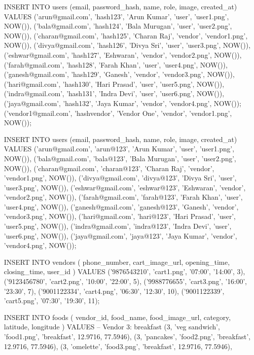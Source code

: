 INSERT INTO users (email, password_hash, name, role, image, created_at)
VALUES
('arun@gmail.com',   'hash123', 'Arun Kumar',   'user',   'user1.png', NOW()),
('bala@gmail.com',   'hash124', 'Bala Murugan', 'user',   'user2.png', NOW()),
('charan@gmail.com', 'hash125', 'Charan Raj',   'vendor', 'vendor1.png', NOW()),
('divya@gmail.com',  'hash126', 'Divya Sri',    'user',   'user3.png', NOW()),
('eshwar@gmail.com', 'hash127', 'Eshwaran',     'vendor', 'vendor2.png', NOW()),
('farah@gmail.com',  'hash128', 'Farah Khan',   'user',   'user4.png', NOW()),
('ganesh@gmail.com', 'hash129', 'Ganesh',       'vendor', 'vendor3.png', NOW()),
('hari@gmail.com',   'hash130', 'Hari Prasad',  'user',   'user5.png', NOW()),
('indra@gmail.com',  'hash131', 'Indra Devi',   'user',   'user6.png', NOW()),
('jaya@gmail.com',   'hash132', 'Jaya Kumar',   'vendor', 'vendor4.png', NOW());
('vendor1@gmail.com', 'hashvendor', 'Vendor One', 'vendor', 'vendor1.png', NOW());


INSERT INTO users (email, password_hash, name, role, image, created_at)
VALUES
('arun@gmail.com',   'arun@123',   'Arun Kumar',   'user',   'user1.png', NOW()),
('bala@gmail.com',   'bala@123',   'Bala Murugan', 'user',   'user2.png', NOW()),
('charan@gmail.com', 'charan@123', 'Charan Raj',   'vendor', 'vendor1.png', NOW()),
('divya@gmail.com',  'divya@123',  'Divya Sri',    'user',   'user3.png', NOW()),
('eshwar@gmail.com', 'eshwar@123', 'Eshwaran',     'vendor', 'vendor2.png', NOW()),
('farah@gmail.com',  'farah@123',  'Farah Khan',   'user',   'user4.png', NOW()),
('ganesh@gmail.com', 'ganesh@123', 'Ganesh',       'vendor', 'vendor3.png', NOW()),
('hari@gmail.com',   'hari@123',   'Hari Prasad',  'user',   'user5.png', NOW()),
('indra@gmail.com',  'indra@123',  'Indra Devi',   'user',   'user6.png', NOW()),
('jaya@gmail.com',   'jaya@123',   'Jaya Kumar',   'vendor', 'vendor4.png', NOW());




INSERT INTO vendors (
  phone_number,
  cart_image_url,
  opening_time,
  closing_time,
  user_id
)
VALUES
('9876543210', 'cart1.png', '07:00', '14:00', 3),
('9123456780', 'cart2.png', '10:00', '22:00', 5),
('9988776655', 'cart3.png', '16:00', '23:30', 7),
('9001122334', 'cart4.png', '06:30', '12:30', 10),
('9001122339', 'cart5.png', '07:30', '19:30', 11); 



INSERT INTO foods (
    vendor_id,
    food_name,
    food_image_url,
    category,
    latitude,
    longitude
)
VALUES
-- Vendor 3: breakfast
(3, 'veg sandwich', 'food1.png', 'breakfast', 12.9716, 77.5946),
(3, 'pancakes', 'food2.png', 'breakfast', 12.9716, 77.5946),
(3, 'omelette', 'food3.png', 'breakfast', 12.9716, 77.5946),

